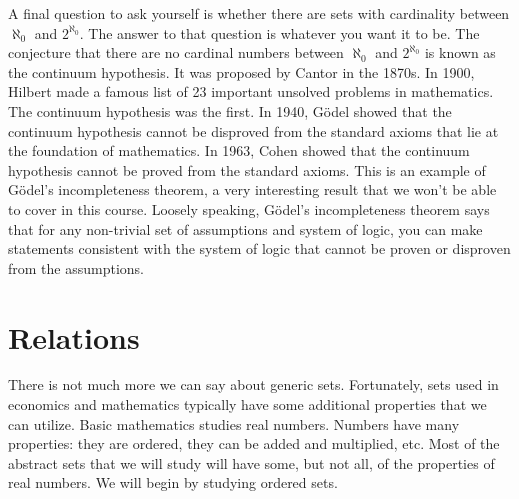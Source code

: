 A final question to ask yourself is whether there are sets with
cardinality between $\aleph_0$ and $2^{\aleph_0}$. The answer to that
question is whatever you want it to be. The conjecture that there are
no cardinal numbers between $\aleph_0$ and $2^{\aleph_0}$ is known as
the continuum hypothesis. It was proposed by Cantor in the 1870s. In
1900, Hilbert made a famous list of 23 important unsolved problems in
mathematics. The continuum hypothesis was the first. In 1940,
G\"{o}del showed that the continuum hypothesis cannot be disproved
from the standard axioms that lie at the foundation of mathematics.
In 1963, Cohen showed that the continuum hypothesis cannot be proved
from the standard axioms. This is an example of G\"{o}del's
incompleteness theorem, a very interesting result that we won't be
able to cover in this course. Loosely speaking, G\"{o}del's
incompleteness theorem says that for any non-trivial set of
assumptions and system of logic, you can make statements consistent
with the system of logic that cannot be proven or disproven from the
assumptions.


\section{Relations}

There is not much more we can say about generic sets. Fortunately,
sets used in economics and mathematics typically have some additional
properties that we can utilize. Basic mathematics studies real
numbers. Numbers have many properties: they are ordered, they can be
added and multiplied, etc. Most of the abstract sets that we will
study will have some, but not all, of the properties of real
numbers. We will begin by studying ordered sets. 

